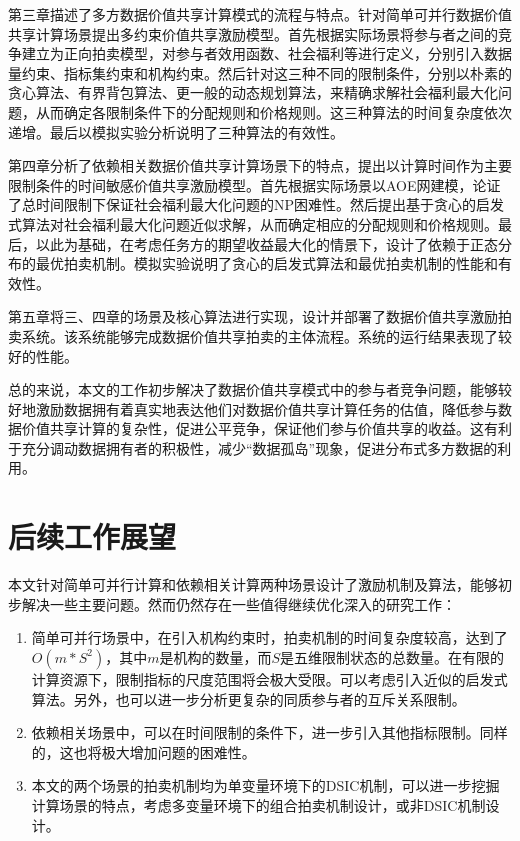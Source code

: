 \documentclass[promaster]{thesis-uestc}
\begin{document}
第三章描述了多方数据价值共享计算模式的流程与特点。针对简单可并行数据价值共享计算场景提出多约束价值共享激励模型。首先根据实际场景将参与者之间的竞争建立为正向拍卖模型，对参与者效用函数、社会福利等进行定义，分别引入数据量约束、指标集约束和机构约束。然后针对这三种不同的限制条件，分别以朴素的贪心算法、有界背包算法、更一般的动态规划算法，来精确求解社会福利最大化问题，从而确定各限制条件下的分配规则和价格规则。这三种算法的时间复杂度依次递增。最后以模拟实验分析说明了三种算法的有效性。

第四章分析了依赖相关数据价值共享计算场景下的特点，提出以计算时间作为主要限制条件的时间敏感价值共享激励模型。首先根据实际场景以AOE网建模，论证了总时间限制下保证社会福利最大化问题的NP困难性。然后提出基于贪心的启发式算法对社会福利最大化问题近似求解，从而确定相应的分配规则和价格规则。最后，以此为基础，在考虑任务方的期望收益最大化的情景下，设计了依赖于正态分布的最优拍卖机制。模拟实验说明了贪心的启发式算法和最优拍卖机制的性能和有效性。

第五章将三、四章的场景及核心算法进行实现，设计并部署了数据价值共享激励拍卖系统。该系统能够完成数据价值共享拍卖的主体流程。系统的运行结果表现了较好的性能。

总的来说，本文的工作初步解决了数据价值共享模式中的参与者竞争问题，能够较好地激励数据拥有着真实地表达他们对数据价值共享计算任务的估值，降低参与数据价值共享计算的复杂性，促进公平竞争，保证他们参与价值共享的收益。这有利于充分调动数据拥有者的积极性，减少“数据孤岛”现象，促进分布式多方数据的利用。

\section{后续工作展望}
本文针对简单可并行计算和依赖相关计算两种场景设计了激励机制及算法，能够初步解决一些主要问题。然而仍然存在一些值得继续优化深入的研究工作：

\begin{enumerate}
    \item 简单可并行场景中，在引入机构约束时，拍卖机制的时间复杂度较高，达到了$O(m*S^2)$，其中$m$是机构的数量，而$S$是五维限制状态的总数量。在有限的计算资源下，限制指标的尺度范围将会极大受限。可以考虑引入近似的启发式算法。另外，也可以进一步分析更复杂的同质参与者的互斥关系限制。
    \item 依赖相关场景中，可以在时间限制的条件下，进一步引入其他指标限制。同样的，这也将极大增加问题的困难性。
    \item 本文的两个场景的拍卖机制均为单变量环境下的DSIC机制，可以进一步挖掘计算场景的特点，考虑多变量环境下的组合拍卖机制设计，或非DSIC机制设计。
\end{enumerate}
\end{document}
